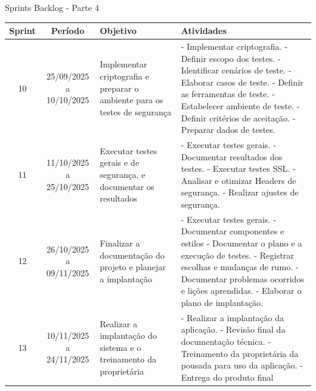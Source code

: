 \documentclass[
	12pt,				%
	openany,			%
	twoside,			%
	a4paper,			%
	english,			%
	french,				%
	spanish,			%
	brazil				%
	]{abntex2}
\begin{document}
\begin{quadro}[H]
	\caption{Sprints Backlog - Parte 4} 
	\label{sprints_backlog_4} 
	\begin{tabular}{|c|c|p{4cm}|p{6cm}|}
		\hline
		\textbf{Sprint} & \textbf{Período} & \textbf{Objetivo} & \textbf{Atividades} \\
		\hline	
		10 & 25/09/2025 a 10/10/2025 & Implementar criptografia e preparar o ambiente para os testes de segurança &
		- Implementar criptografia. \newline
		- Definir escopo dos testes. \newline
		- Identificar cenários de teste. \newline
		- Elaborar casos de teste. \newline
		- Definir as ferramentas de teste. \newline
		- Estabelecer ambiente de teste. \newline
		- Definir critérios de aceitação. \newline
		- Preparar dados de testes. \\
		\hline	
		11 & 11/10/2025 a 25/10/2025 & Executar testes gerais e de segurança, e documentar os resultados &
		- Executar testes gerais. \newline
		- Documentar resultados dos testes. \newline
		- Executar testes SSL. \newline
		- Analisar e otimizar Headers de segurança. \newline
		- Realizar ajustes de segurança. \\
		\hline
		12 & 26/10/2025 a 09/11/2025 & Finalizar a documentação do projeto e planejar a implantação &
		- Executar testes gerais. \newline
		- Documentar componentes e estilos \newline
		- Documentar o plano e a execução de testes. \newline
		- Registrar escolhas e mudanças de rumo. \newline
		- Documentar problemas ocorridos e lições aprendidas. \newline
		- Elaborar o plano de implantação.	\\
		\hline
		13 & 10/11/2025 a 24/11/2025 & Realizar a implantação do sistema e o treinamento da proprietária &
		- Realizar a implantação da aplicação. \newline
		- Revisão final da documentação técnica. \newline
		- Treinamento da proprietária da pousada para uso da aplicação. \newline
		- Entrega do produto final \\
\hline
\end{tabular}
\end{quadro}
\end{document}
